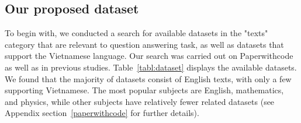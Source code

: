 \documentclass{article}
\begin{document}
{	\subsection{Our proposed dataset}
	
	To begin with, we conducted a search for available datasets in the "texts" category that are relevant to question answering task, as well as datasets that support the Vietnamese language. Our search was carried out on Paperwithcode as well as in previous studies. Table~\ref{tabl:dataset} displays the available datasets. We found that the majority of datasets consist of English texts, with only a few supporting Vietnamese. The most popular subjects are English, mathematics, and physics, while other subjects have relatively fewer related datasets (see Appendix section~\ref{paperwithcode} for further details).
	
}
\end{document}
